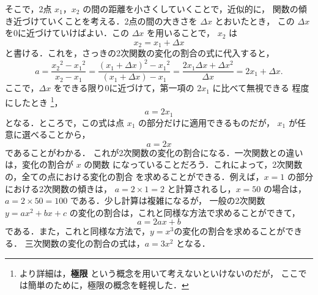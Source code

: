             そこで，2点 $x_{1}$，$x_{2}$ の間の距離を小さくしていくことで，近似的に，
            関数の傾き近づけていくことを考える．2点の間の大きさを $\Delta x$ とおいたとき，
            この $\Delta x$ を0に近づけていけばよい．この $\Delta x$ を用いることで，
            $x_{2}$ は
            \begin{equation*}
                x_{2}=x_{1}+\Delta x
            \end{equation*}
            と書ける．これを，さっきの2次関数の変化の割合の式に代入すると，
            \begin{equation*}
                a = \frac{{x_{2}}^{2}-{x_{1}}^{2}}{x_{2}-x_{1}}
                = \frac{({x_{1}+\Delta x})^{2}-{x_{1}}^{2}}{(x_{1}+\Delta x)-x_{1}}
                = \frac{2x_{1}\Delta x +\Delta x^{2}}{\Delta x}
                = 2x_{1} + \Delta x.
            \end{equation*}
            ここで，$\Delta x$ をできる限り0に近づけて，第一項の $2x_{1}$ に比べて無視できる
            程度にしたとき
                \footnote{
                    より詳細は，\textbf{極限} という概念を用いて考えないといけないのだが，
                    ここでは簡単のために，極限の概念を軽視した．
                }，
            \begin{equation*}
                a = 2x_{1}
            \end{equation*}
            となる．ところで，この式は点 $x_{1}$ の部分だけに適用できるものだが，
            $x_{1}$ が任意に選べることから，
            \begin{equation*}
                a = 2x
            \end{equation*}
            であることがわかる．
            これが2次関数の変化の割合になる．一次関数との違いは，変化の割合が $x$ の関数
            になっていることだろう．これによって，2次関数の，全ての点における変化の割合
            を求めることができる．例えば，$x=1$ の部分における2次関数の傾きは，
            $a=2 \times 1 = 2$ と計算されるし，$x = 50$ の場合は，
            $a=2 \times 50 = 100$ である．少し計算は複雑になるが，
            一般の2次関数 $y=ax^{2}+bx+c$ の変化の割合は，これと同様な方法で求めることができて，
            \begin{equation*}
                a = 2ax + b
            \end{equation*}
            である．また，これと同様な方法で，$y=x^{3}$の変化の割合を求めることができる．
            三次関数の変化の割合の式は，$a = 3x^{2}$ となる．

